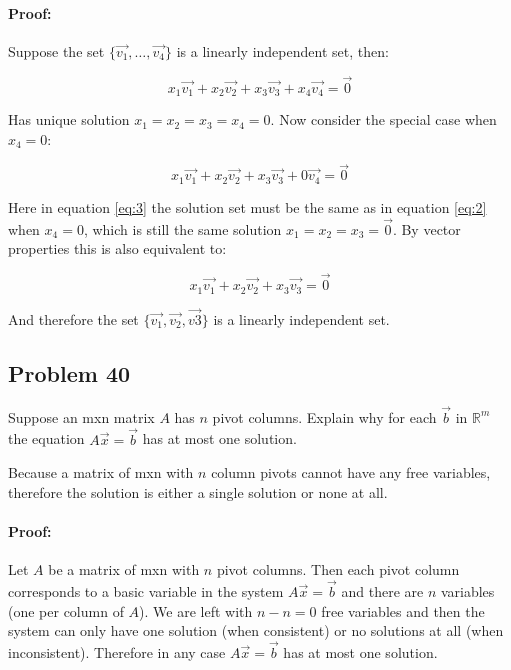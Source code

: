 \documentclass[12pt, letterpaper]{article}
\newcommand{\R}{\mathbb{R}}
\theoremstyle{statement}
\newenvironment{atmProof}{\noindent\ignorespaces\paragraph{Proof:}}{\hfill \ding{122}\par\noindent}
\begin{document}
            \begin{atmProof}
            Suppose the set $\{\vec{v_1}, \dots, \vec{v_4}\}$ is a linearly independent set, then:
            
            \begin{equation}
                x_1\vec{v_1} + x_2\vec{v_2} + x_3\vec{v_3}+ x_4\vec{v_4} = \vec{0}
                \label{eq:2}
            \end{equation}
            
            Has unique solution $x_1=x_2=x_3=x_4=0$. Now consider the special case when $x_4=0$:
            
            \begin{equation}
                x_1\vec{v_1} + x_2\vec{v_2} + x_3\vec{v_3} + 0\vec{v_4}=\vec{0}
                \label{eq:3}
            \end{equation}
            
            Here in equation \ref{eq:3} the solution set must be the same as in equation \ref{eq:2} when $x_4=0$, which is still the same solution $x_1=x_2=x_3=\vec{0}$. By vector properties this is also equivalent to:
            
            $$x_1\vec{v_1} + x_2\vec{v_2}+x_3\vec{v_3}=\vec{0}$$
            
            And therefore the set $\{\vec{v_1},\vec{v_2},\vec{v3}\}$ is a linearly independent set.
            
            \end{atmProof}
            
            \subsection*{Problem 40}
            Suppose an mxn matrix $A$ has $n$ pivot columns. Explain why for each $\vec{b}$ in $\R^m$ the equation $A\vec{x}=\vec{b}$ has at most one solution.
            
            Because a matrix of mxn with $n$ column pivots cannot have any free variables, therefore the solution is either a single solution or none at all.
            
            \begin{atmProof}
            Let $A$ be a matrix of mxn with $n$ pivot columns. Then each pivot column corresponds to a basic variable in the system $A\vec{x}=\vec{b}$ and there are $n$ variables (one per column of $A$). We are left with $n - n = 0$ free variables and then the system can only have one solution (when consistent) or no solutions at all (when inconsistent). Therefore in any case $A\vec{x}=\vec{b}$ has at most one solution. 
            \end{atmProof}
            
\end{document}
